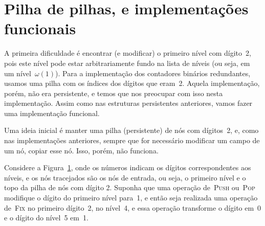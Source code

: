 \documentclass[main.tex]{subfiles}
\begin{document}
\section{Pilha de pilhas, e implementações funcionais} \label{sec:implfunc}

A primeira dificuldade é encontrar (e modificar) o primeiro nível com dígito~2, pois este nível pode estar arbitrariamente fundo na lista de níveis (ou seja, em um nível~$\omega(1)$). Para a implementação dos contadores binários redundantes, usamos uma pilha com os índices dos dígitos que eram~2. Aquela implementação, porém, não era persistente, e temos que nos preocupar com isso nesta implementação. Assim como nas estruturas persistentes anteriores, vamos fazer uma implementação funcional.


\begin{figure}
\centering
{}
\caption{} \label{fig:func_ex1}
\end{figure}

Uma ideia inicial é manter uma pilha (persistente) de nós com dígitos~2, e, como nas implementações anteriores, sempre que for necessário modificar um campo de um nó, copiar esse nó. Isso, porém, não funciona.

Considere a Figura~\ref{fig:func_ex1}, onde os números indicam os dígitos correspondentes aos níveis, e os nós tracejados são os nós de entrada, ou seja, o primeiro nível e o topo da pilha de nós com dígito 2. Suponha que uma operação de~\textsc{Push} ou~\textsc{Pop} modifique o dígito do primeiro nível para~1, e então seja realizada uma operação de~\textsc{Fix} no primeiro dígito~2, no nível~4, e essa operação transforme o dígito em~0 e o dígito do nível~5 em~1.
\end{document}
